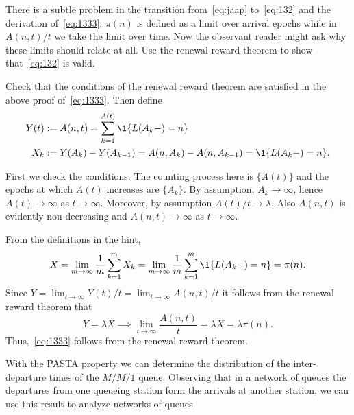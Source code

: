 \begin{exercise}
 There is a subtle problem in the transition from~\cref{eq:jaap} to~\cref{eq:132} and the derivation of~\cref{eq:1333}: $\pi(n)$ is defined as a limit over arrival epochs while in $A(n,t)/t$ we take the limit over time.
 Now the observant reader might ask why these limits should relate at all.
 Use the renewal reward theorem to show that~\cref{eq:132} is valid.
\begin{hint}
Check that the conditions of the renewal reward theorem are satisfied in the above proof of~\cref{eq:1333}. Then define 
\begin{align*}
 Y(t) &:= A(n,t) = \sum_{k=1}^{A(t)} \1{L(A_k-) = n} \\
X_k &:= Y(A_k) - Y(A_{k-1}) = A(n, A_k) - A(n, A_{k-1}) = \1{L(A_k-)=n}.
\end{align*}

\end{hint}
\begin{solution}
First we check the conditions. The counting process here is $\{A(t)\}$ and the epochs at which
 $A(t)$ increases are $\{A_k\}$. By assumption, $A_k\to\infty$,
 hence $A(t)\to\infty$ as $t\to\infty$. Moreover, by assumption
 $A(t)/t \to \lambda$. Also $A(n,t)$ is evidently non-decreasing and
 $A(n,t)\to\infty$ as $t\to\infty$.


From the definitions in the hint, 
\begin{equation*}
X= \lim_{m\to\infty} \frac 1 m \sum_{k=1}^m X_k =\lim_{m\to\infty} \frac 1 m \sum_{k=1}^m \1{L(A_k-)=n} = \pi(n).
\end{equation*}
Since $Y=\lim_{t\to\infty} Y(t)/t = \lim_{t\to\infty} A(n,t)/t$ it follows from the renewal reward theorem that
\begin{equation*}
 Y=\lambda X \implies \lim_{t\to\infty} \frac{A(n,t)} t = \lambda X = \lambda \pi(n).
\end{equation*}
Thus,~\cref{eq:1333} follows from the renewal reward theorem.
\end{solution}
\end{exercise}

With the PASTA property we can determine the distribution of the inter-departure times of the $M/M/1$ queue.
Observing that in a network of queues the departures from one queueing station form the arrivals at another station, we can use this result to analyze networks of queues

